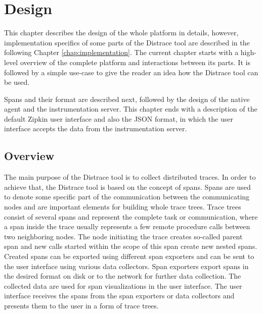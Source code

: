 \chapter{Design}
\label{chap:design}
This chapter describes the design of the whole platform in details, however, implementation specifics of some parts of the Distrace tool are described in the following Chapter \ref{chap:implementation}. The current chapter starts with a high-level overview of the complete platform and interactions between its parts. It is followed by a simple use-case to give the reader an idea how the Distrace tool can be used.

Spans and their format are described next, followed by the design of the native agent and the instrumentation server. This chapter ends with a description of the default Zipkin user interface and also the JSON format, in which the user interface accepts the data from the instrumentation server. 

\section{Overview}
\label{design:overview}
The main purpose of the Distrace tool is to collect distributed traces. In order to achieve that, the Distrace tool is based on the concept of spans. Spans are used to denote some specific part of the communication between the communicating nodes and are important elements for building whole trace trees. Trace trees consist of several spans and represent the complete task or communication, where a span inside the trace usually represents a few remote procedure calls between two neighboring nodes. The node initiating the trace creates so-called parent span and new calls started within the scope of this span create new nested spans. Created spans can be exported using different span exporters and can be sent to the user interface using various data collectors. Span exporters export spans in the desired format on disk or to the network for further data collection. The collected data are used for span visualizations in the user interface. The user interface receives the spans from the span exporters or data collectors and presents them to the user in a form of trace trees.

